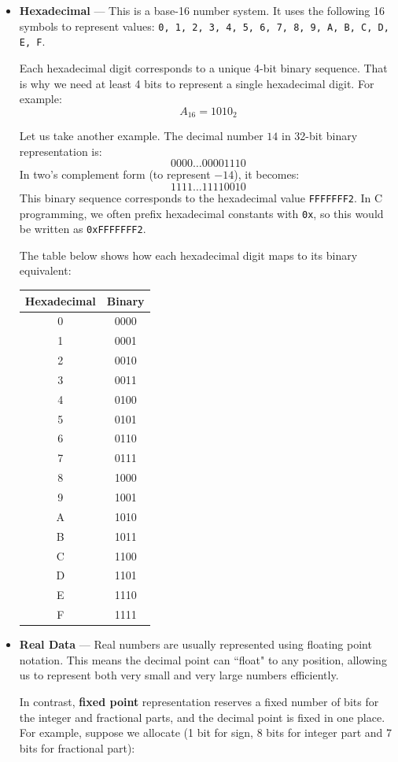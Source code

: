 \documentclass[12pt]{book}
\begin{document}
\begin{itemize}
\item \textbf{Hexadecimal} — This is a base-16 number system. It uses the following 16 symbols to represent values: \texttt{0, 1, 2, 3, 4, 5, 6, 7, 8, 9, A, B, C, D, E, F}.

Each hexadecimal digit corresponds to a unique 4-bit binary sequence. That is why we need at least 4 bits to represent a single hexadecimal digit. For example:
\[
A_{16} = 1010_2
\]

Let us take another example. The decimal number $14$ in 32-bit binary representation is:
\[
0000\ldots00001110
\]
In two's complement form (to represent $-14$), it becomes:
\[
1111\ldots11110010
\]
This binary sequence corresponds to the hexadecimal value \texttt{FFFFFFF2}. In C programming, we often prefix hexadecimal constants with \texttt{0x}, so this would be written as \texttt{0xFFFFFFF2}.

\medskip
The table below shows how each hexadecimal digit maps to its binary equivalent:

\begin{center}
\begin{tabular}{|c|c|}
\hline
\textbf{Hexadecimal} & \textbf{Binary} \\
\hline
0 & 0000 \\
1 & 0001 \\
2 & 0010 \\
3 & 0011 \\
4 & 0100 \\
5 & 0101 \\
6 & 0110 \\
7 & 0111 \\
8 & 1000 \\
9 & 1001 \\
A & 1010 \\
B & 1011 \\
C & 1100 \\
D & 1101 \\
E & 1110 \\
F & 1111 \\
\hline
\end{tabular}
\end{center}

\item \textbf{Real Data} — Real numbers are usually represented using floating point notation. This means the decimal point can ``float" to any position, allowing us to represent both very small and very large numbers efficiently.

In contrast, \textbf{fixed point} representation reserves a fixed number of bits for the integer and fractional parts, and the decimal point is fixed in one place. For example, suppose we allocate (1 bit for sign, 8 bits for integer part and 7 bits for fractional part):


\end{itemize}
\end{document}
